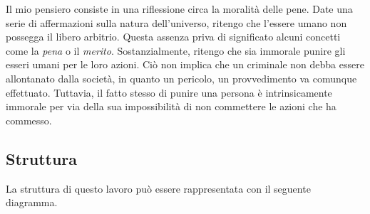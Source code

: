 \documentclass[a4paper, 12pt]{article}
\begin{document}
Il mio pensiero consiste in una riflessione circa la moralità delle pene.
Date una serie di affermazioni sulla natura dell'universo, ritengo che l'essere umano
non possegga il libero arbitrio. Questa assenza priva di significato alcuni concetti come la
\textit{pena} o il \textit{merito}. Sostanzialmente, ritengo che sia immorale punire gli esseri
umani per le loro azioni. Ciò non implica che un criminale non debba essere allontanato dalla società,
in quanto un pericolo, un provvedimento va comunque effettuato. Tuttavia,
il fatto stesso di punire una persona è intrinsicamente immorale per via
della sua impossibilità di non commettere le azioni che ha commesso.

\pagebreak

\subsection{Struttura}

La struttura di questo lavoro può essere rappresentata con il seguente diagramma.

\vspace{0.75cm}

\end{document}

